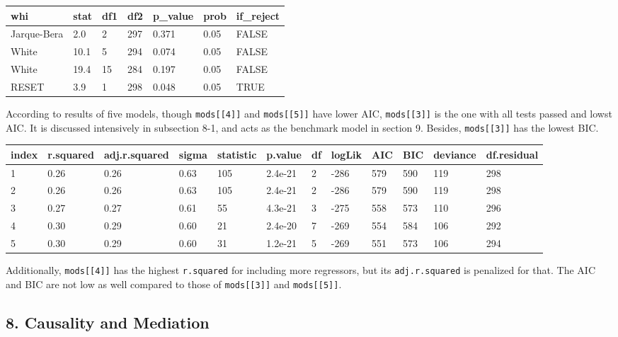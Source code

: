 \documentclass[a4paper]{article}
\begin{document}
\begin{table}[H]
\centering
\begin{tabular}{lllllll}
\toprule
whi & stat & df1 & df2 & p\_value & prob & if\_reject\\
\midrule
Jarque-Bera & 2.0 & 2 & 297 & 0.371 & 0.05 & FALSE\\
White & 10.1 & 5 & 294 & 0.074 & 0.05 & FALSE\\
White & 19.4 & 15 & 284 & 0.197 & 0.05 & FALSE\\
RESET & 3.9 & 1 & 298 & 0.048 & 0.05 & TRUE\\
\bottomrule
\end{tabular}
\end{table}

According to results of five models, though \texttt{mods{[}{[}4{]}{]}}
and \texttt{mods{[}{[}5{]}{]}} have lower AIC,
\texttt{mods{[}{[}3{]}{]}} is the one with all tests passed and lowst
AIC. It is discussed intensively in subsection 8-1, and acts as the
benchmark model in section 9. Besides, \texttt{mods{[}{[}3{]}{]}} has
the lowest BIC.

\begin{table}[H]
\centering
\begin{tabular}{llllllllllll}
\toprule
index & r.squared & adj.r.squared & sigma & statistic & p.value & df & logLik & AIC & BIC & deviance & df.residual\\
\midrule
1 & 0.26 & 0.26 & 0.63 & 105 & 2.4e-21 & 2 & -286 & 579 & 590 & 119 & 298\\
2 & 0.26 & 0.26 & 0.63 & 105 & 2.4e-21 & 2 & -286 & 579 & 590 & 119 & 298\\
3 & 0.27 & 0.27 & 0.61 & 55 & 4.3e-21 & 3 & -275 & 558 & 573 & 110 & 296\\
4 & 0.30 & 0.29 & 0.60 & 21 & 2.4e-20 & 7 & -269 & 554 & 584 & 106 & 292\\
5 & 0.30 & 0.29 & 0.60 & 31 & 1.2e-21 & 5 & -269 & 551 & 573 & 106 & 294\\
\bottomrule
\end{tabular}
\end{table}

Additionally, \texttt{mods{[}{[}4{]}{]}} has the highest
\texttt{r.squared} for including more regressors, but its
\texttt{adj.r.squared} is penalized for that. The AIC and BIC are not
low as well compared to those of \texttt{mods{[}{[}3{]}{]}} and
\texttt{mods{[}{[}5{]}{]}}.

\hypertarget{causality-and-mediation}{%
\subsection{8. Causality and Mediation}\label{causality-and-mediation}}
\end{document}
